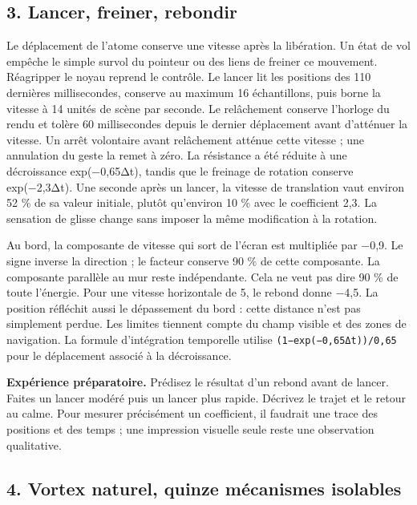 \documentclass[
  canadien,
  11pt,
  letterpaper,
]{article}
\begin{document}
\subsection{3. Lancer, freiner, rebondir}\label{lancer-freiner-rebondir}

Le déplacement de l'atome conserve une vitesse après la libération. Un
état de vol empêche le simple survol du pointeur ou des liens de freiner
ce mouvement. Réagripper le noyau reprend le contrôle. Le lancer lit les
positions des 110 dernières millisecondes, conserve au maximum 16
échantillons, puis borne la vitesse à 14 unités de scène par seconde. Le
relâchement conserve l'horloge du rendu et tolère 60 millisecondes
depuis le dernier déplacement avant d'atténuer la vitesse. Un arrêt
volontaire avant relâchement atténue cette vitesse ; une annulation du
geste la remet à zéro. La résistance a été réduite à une décroissance
exp(−0,65Δt), tandis que le freinage de rotation conserve exp(−2,3Δt).
Une seconde après un lancer, la vitesse de translation vaut environ 52
\% de sa valeur initiale, plutôt qu'environ 10 \% avec le coefficient
2,3. La sensation de glisse change sans imposer la même modification à
la rotation.

Au bord, la composante de vitesse qui sort de l'écran est multipliée par
−0,9. Le signe inverse la direction ; le facteur conserve 90 \% de cette
composante. La composante parallèle au mur reste indépendante. Cela ne
veut pas dire 90 \% de toute l'énergie. Pour une vitesse horizontale de
5, le rebond donne −4,5. La position réfléchit aussi le dépassement du
bord : cette distance n'est pas simplement perdue. Les limites tiennent
compte du champ visible et des zones de navigation. La formule
d'intégration temporelle utilise \texttt{(1−exp(−0,65Δt))/0,65} pour le
déplacement associé à la décroissance.

\textbf{Expérience préparatoire.} Prédisez le résultat d'un rebond avant
de lancer. Faites un lancer modéré puis un lancer plus rapide. Décrivez
le trajet et le retour au calme. Pour mesurer précisément un
coefficient, il faudrait une trace des positions et des temps ; une
impression visuelle seule reste une observation qualitative.

\subsection{4. Vortex naturel, quinze mécanismes
isolables}\label{vortex-naturel-quinze-muxe9canismes-isolables}
\end{document}
